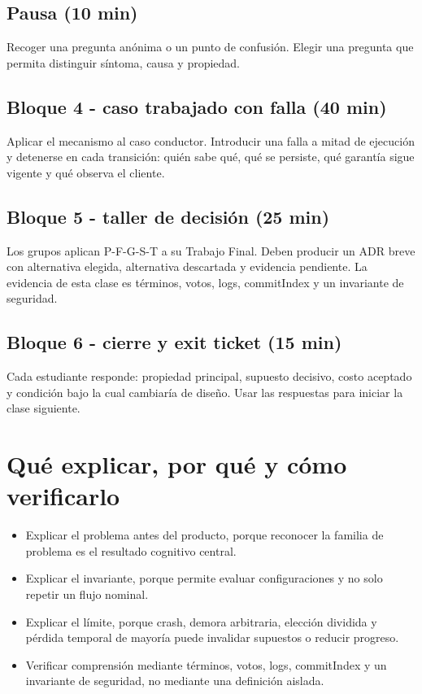 \documentclass[variant=docente,cover=institutional,mode=screen]{ua-engineering-v6-article}
\begin{document}
\subsection*{Pausa (10 min)}
Recoger una pregunta anónima o un punto de confusión. Elegir una pregunta que permita distinguir síntoma, causa y propiedad.

\subsection*{Bloque 4 - caso trabajado con falla (40 min)}
Aplicar el mecanismo al caso conductor. Introducir una falla a mitad de ejecución y detenerse en cada transición: quién sabe qué, qué se persiste, qué garantía sigue vigente y qué observa el cliente.

\subsection*{Bloque 5 - taller de decisión (25 min)}
Los grupos aplican P-F-G-S-T a su Trabajo Final. Deben producir un ADR breve con alternativa elegida, alternativa descartada y evidencia pendiente. La evidencia de esta clase es términos, votos, logs, commitIndex y un invariante de seguridad.

\subsection*{Bloque 6 - cierre y exit ticket (15 min)}
Cada estudiante responde: propiedad principal, supuesto decisivo, costo aceptado y condición bajo la cual cambiaría de diseño. Usar las respuestas para iniciar la clase siguiente.

\section{Qué explicar, por qué y cómo verificarlo}
\begin{itemize}
\item Explicar el problema antes del producto, porque reconocer la familia de problema es el resultado cognitivo central.
\item Explicar el invariante, porque permite evaluar configuraciones y no solo repetir un flujo nominal.
\item Explicar el límite, porque crash, demora arbitraria, elección dividida y pérdida temporal de mayoría puede invalidar supuestos o reducir progreso.
\item Verificar comprensión mediante términos, votos, logs, commitIndex y un invariante de seguridad, no mediante una definición aislada.
\end{itemize}
\end{document}
